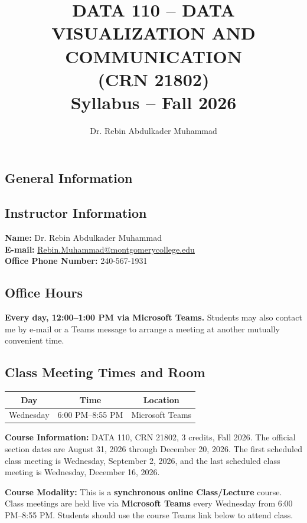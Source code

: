 \documentclass{exam}
\author{Dr. Rebin Abdulkader Muhammad}
\title{DATA 110 -- DATA VISUALIZATION AND COMMUNICATION \\(CRN 21802)\\Syllabus -- Fall 2026}
\date{}
\begin{document}
\maketitle
\begin{center}
\section{General Information}
\end{center}

\subsection*{Instructor Information}
\textbf{Name:} Dr. Rebin Abdulkader Muhammad \\
\textbf{E-mail:} \href{mailto:Rebin.Muhammad@montgomerycollege.edu}{Rebin.Muhammad@montgomerycollege.edu} \\
\textbf{Office Phone Number:} 240-567-1931

\subsection*{Office Hours}
\textbf{Every day, 12:00--1:00 PM via Microsoft Teams.} Students may also contact me by e-mail or a Teams message to arrange a meeting at another mutually convenient time.

\subsection*{Class Meeting Times and Room}

\begin{center}
\begin{tabular}{| c | c | c |}
\hline
\textbf{Day} & \textbf{Time} & \textbf{Location} \\
\hline
Wednesday & 6:00 PM--8:55 PM & Microsoft Teams \\
\hline
\end{tabular}
\end{center}

\noindent \textbf{Course Information:} DATA 110, CRN 21802, 3 credits, Fall 2026. The official section dates are August 31, 2026 through December 20, 2026. The first scheduled class meeting is Wednesday, September 2, 2026, and the last scheduled class meeting is Wednesday, December 16, 2026.

\noindent \textbf{Course Modality:} This is a \textbf{synchronous online Class/Lecture} course. Class meetings are held live via \textbf{Microsoft Teams} every Wednesday from 6:00 PM--8:55 PM. Students should use the course Teams link below to attend class.
\end{document}
